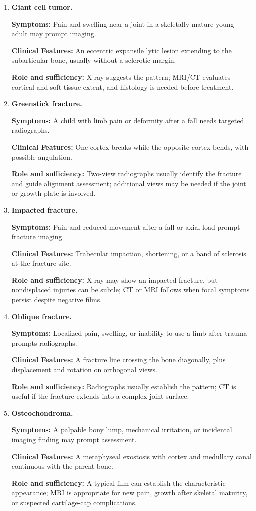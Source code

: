 \begin{enumerate}[leftmargin=*,itemsep=0.45em,topsep=0.4em]
\item \textbf{Giant cell tumor.}\par\noindent\textbf{Symptoms:} Pain and swelling near a joint in a skeletally mature young adult may prompt imaging.\par\noindent\textbf{Clinical Features:} An eccentric expansile lytic lesion extending to the subarticular bone, usually without a sclerotic margin.\par\noindent\textbf{Role and sufficiency:} X-ray suggests the pattern; MRI/CT evaluates cortical and soft-tissue extent, and histology is needed before treatment.
\item \textbf{Greenstick fracture.}\par\noindent\textbf{Symptoms:} A child with limb pain or deformity after a fall needs targeted radiographs.\par\noindent\textbf{Clinical Features:} One cortex breaks while the opposite cortex bends, with possible angulation.\par\noindent\textbf{Role and sufficiency:} Two-view radiographs usually identify the fracture and guide alignment assessment; additional views may be needed if the joint or growth plate is involved.
\item \textbf{Impacted fracture.}\par\noindent\textbf{Symptoms:} Pain and reduced movement after a fall or axial load prompt fracture imaging.\par\noindent\textbf{Clinical Features:} Trabecular impaction, shortening, or a band of sclerosis at the fracture site.\par\noindent\textbf{Role and sufficiency:} X-ray may show an impacted fracture, but nondisplaced injuries can be subtle; CT or MRI follows when focal symptoms persist despite negative films.
\item \textbf{Oblique fracture.}\par\noindent\textbf{Symptoms:} Localized pain, swelling, or inability to use a limb after trauma prompts radiographs.\par\noindent\textbf{Clinical Features:} A fracture line crossing the bone diagonally, plus displacement and rotation on orthogonal views.\par\noindent\textbf{Role and sufficiency:} Radiographs usually establish the pattern; CT is useful if the fracture extends into a complex joint surface.
\item \textbf{Osteochondroma.}\par\noindent\textbf{Symptoms:} A palpable bony lump, mechanical irritation, or incidental imaging finding may prompt assessment.\par\noindent\textbf{Clinical Features:} A metaphyseal exostosis with cortex and medullary canal continuous with the parent bone.\par\noindent\textbf{Role and sufficiency:} A typical film can establish the characteristic appearance; MRI is appropriate for new pain, growth after skeletal maturity, or suspected cartilage-cap complications.

\end{enumerate}
